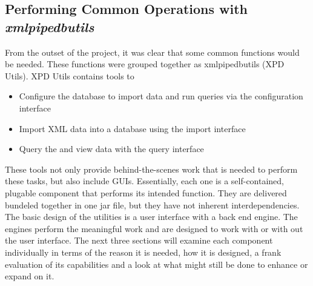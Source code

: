 \subsection{Performing Common Operations with \emph{xmlpipedbutils}}
From the outset of the project, it was clear that some common functions would be needed. These functions were grouped together as xmlpipedbutils (XPD Utils). XPD Utils contains tools to 
\begin{itemize}
	\item {Configure the database to import data and run queries via the configuration interface}
	\item {Import XML data into a database using the import interface}
	\item {Query the and view data with the query interface}
\end{itemize}
\par
These tools not only provide behind-the-scenes work that is needed to perform these tasks, but also include GUIs. Essentially, each one is a self-contained, plugable component that performs its intended function. They are delivered bundeled together in one jar file, but they have not inherent interdependencies. 	The basic design of the utilities is a user interface with a back end engine. The engines perform the meaningful work and are designed to work with or with out the user interface. The next three sections will examine each component individually in terms of the reason it is needed, how it is designed, a frank evaluation of its capabilities and a look at what might still be done to enhance or expand on it.


